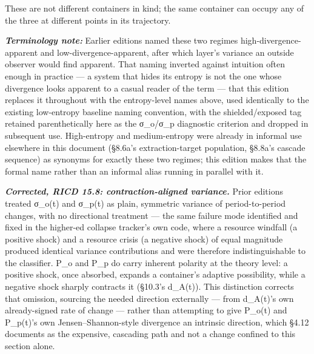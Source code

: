 \documentclass[
]{article}
\begin{document}
These are not different containers in kind; the same container can
occupy any of the three at different points in its trajectory.

\emph{\textbf{Terminology note:}} Earlier editions named these two
regimes high-divergence-apparent and low-divergence-apparent, after
which layer's variance an outside observer would find apparent. That
naming inverted against intuition often enough in practice --- a system
that hides its entropy is not the one whose divergence looks apparent to
a casual reader of the term --- that this edition replaces it throughout
with the entropy-level names above, used identically to the existing
low-entropy baseline naming convention, with the shielded/exposed tag
retained parenthetically here as the σ\_o/σ\_p diagnostic criterion and
dropped in subsequent use. High-entropy and medium-entropy were already
in informal use elsewhere in this document (§8.6a's extraction-target
population, §8.8a's cascade sequence) as synonyms for exactly these two
regimes; this edition makes that the formal name rather than an informal
alias running in parallel with it.

\emph{\textbf{Corrected, RICD 15.8: contraction-aligned variance.}} Prior editions treated σ\_o(t) and σ\_p(t) as plain, symmetric variance of period-to-period changes, with no directional treatment --- the same failure mode identified and fixed in the higher-ed collapse tracker's own code, where a resource windfall (a positive shock) and a resource crisis (a negative shock) of equal magnitude produced identical variance contributions and were therefore indistinguishable to the classifier. P\_o and P\_p do carry inherent polarity at the theory level: a positive shock, once absorbed, expands a container's adaptive possibility, while a negative shock sharply contracts it (§10.3's d\_A(t)). This distinction corrects that omission, sourcing the needed direction externally --- from d\_A(t)'s own already-signed rate of change --- rather than attempting to give P\_o(t) and P\_p(t)'s own Jensen--Shannon-style divergence an intrinsic direction, which §4.12 documents as the expensive, cascading path and not a change confined to this section alone.
\end{document}
